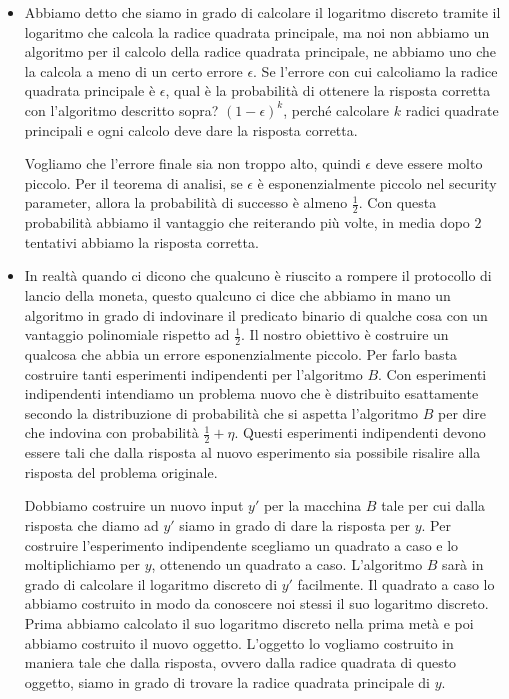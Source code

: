 \begin{itemize}
    \item Abbiamo detto che siamo in grado di calcolare il logaritmo discreto tramite il logaritmo che calcola la radice quadrata principale, ma noi non abbiamo un algoritmo per il calcolo della radice quadrata principale, ne abbiamo uno che la calcola a meno di un certo errore $\epsilon$. Se l'errore con cui calcoliamo la radice quadrata principale è $\epsilon$, qual è la probabilità di ottenere la risposta corretta con l'algoritmo descritto sopra? $(1-\epsilon)^k$, perché  calcolare $k$ radici quadrate principali e ogni calcolo deve dare la risposta corretta. 

    Vogliamo che l'errore finale sia non troppo alto, quindi $\epsilon$ deve essere molto piccolo. Per il teorema di analisi, se $\epsilon$ è esponenzialmente piccolo nel security parameter, allora la probabilità di successo è almeno $\frac{1}{2}$. Con questa probabilità abbiamo il vantaggio che reiterando più volte, in media dopo $2$ tentativi abbiamo la risposta corretta. 

    \item In realtà quando ci dicono che qualcuno è riuscito a rompere il protocollo di lancio della moneta, questo qualcuno ci dice che abbiamo in mano un algoritmo in grado di indovinare il predicato binario di qualche cosa con un vantaggio polinomiale rispetto ad $\frac{1}{2}$. Il nostro obiettivo è costruire un qualcosa che abbia un errore esponenzialmente piccolo. Per farlo basta costruire tanti esperimenti indipendenti per l'algoritmo $B$. Con esperimenti indipendenti intendiamo un problema nuovo che è distribuito esattamente secondo la distribuzione di probabilità che si aspetta l'algoritmo $B$ per dire che indovina con probabilità $\frac{1}{2} + \eta$. Questi esperimenti indipendenti devono essere tali che dalla risposta al nuovo esperimento sia possibile risalire alla risposta del problema originale. 

    Dobbiamo costruire un nuovo input $y'$ per la macchina $B$ tale per cui dalla risposta che diamo ad $y'$ siamo in grado di dare la risposta per $y$. Per costruire l'esperimento indipendente scegliamo un quadrato a caso e lo moltiplichiamo per $y$, ottenendo un quadrato a caso. L'algoritmo $B$ sarà in grado di calcolare il logaritmo discreto di $y'$ facilmente. Il quadrato a caso lo abbiamo costruito in modo da conoscere noi stessi il suo logaritmo discreto. Prima abbiamo calcolato il suo logaritmo discreto nella prima metà e poi abbiamo costruito il nuovo oggetto. L'oggetto lo vogliamo costruito in maniera tale che dalla risposta, ovvero dalla radice quadrata di questo oggetto, siamo in grado di trovare la radice quadrata principale di $y$.


\end{itemize}
